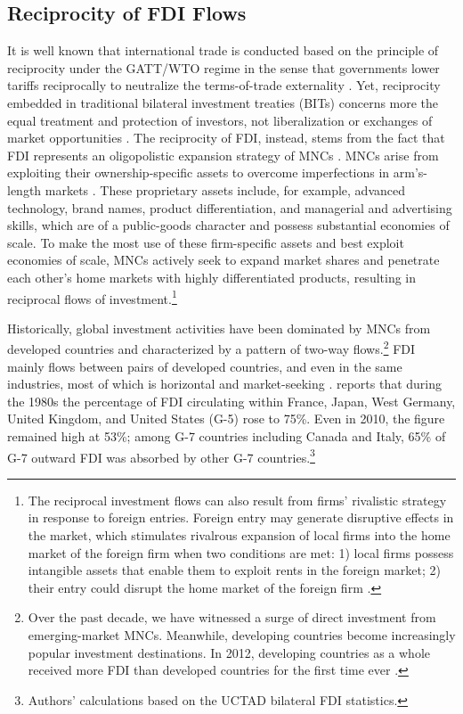 \documentclass[reqno,onecolumn,letterpaper,12pt]{article}
\begin{document}
\subsection{Reciprocity of FDI Flows}
It is well known that international trade is conducted based on the principle of reciprocity under the GATT/WTO regime in the sense that governments lower tariffs reciprocally to neutralize the terms-of-trade externality \citep{Bagwell_Staiger:1999}. Yet, reciprocity embedded in traditional bilateral investment treaties (BITs) concerns more the equal treatment and protection of investors, not liberalization or exchanges of market opportunities \citep[~56]{DiMascio_Pauwelyn:2008}. The reciprocity of FDI, instead, stems from the fact that FDI represents an oligopolistic expansion strategy of MNCs \citep{Hymer:1976,Kindleberger:1969}. MNCs arise from exploiting their ownership-specific assets to overcome imperfections in arm's-length markets \citep{Caves:1996,Dunning:1992}. These proprietary assets include, for example, advanced technology, brand names, product differentiation, and managerial and advertising skills, which are of a public-goods character and possess substantial economies of scale. To make the most use of these firm-specific assets and best exploit economies of scale, MNCs actively seek to expand market shares and penetrate each other's home markets with highly differentiated products, resulting in reciprocal flows of investment.\footnote{The reciprocal investment flows can also result from firms' rivalistic strategy in response to foreign entries. Foreign entry may generate disruptive effects in the market, which stimulates rivalrous expansion of local firms into the home market of the foreign firm when two conditions are met: 1) local firms possess intangible assets that enable them to exploit rents in the foreign market; 2) their entry could disrupt the home market of the foreign firm \citep{Graham:1978}. }

Historically, global investment activities have been dominated by MNCs from developed countries and characterized by a pattern of two-way flows.\footnote{Over the past decade, we have witnessed a surge of direct investment from emerging-market MNCs. Meanwhile, developing countries become increasingly popular investment destinations. In 2012, developing countries as a whole received more FDI than developed countries for the first time ever \citep{UNCTAD:2013}.} FDI mainly flows between pairs of developed countries, and even in the same industries, most of which is horizontal and market-seeking \citep[171]{Markusen:1995}. \citet[~22]{Julius:1990} reports that during the 1980s the percentage of FDI circulating within France, Japan, West Germany, United Kingdom, and United States (G-5) rose to 75\%. Even in 2010, the figure remained high at 53\%; among G-7 countries including Canada and Italy, 65\% of G-7 outward FDI was absorbed by other G-7 countries.\footnote{Authors' calculations based on the UCTAD bilateral FDI statistics.}
\end{document}
